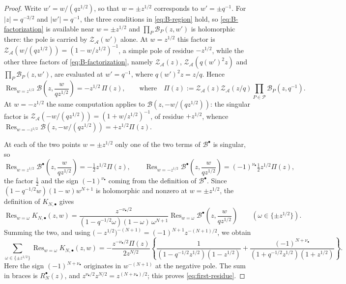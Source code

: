 \documentclass[a4paper,reqno]{amsart}
\numberwithin{equation}{section}
\theoremstyle{remark}
\theoremstyle{definition}
\newcommand{\A}{\mathcal{A}}
\begin{document}
\begin{proof}
Write $w'=w/(qz^{1/2})$, so that $w=\pm z^{1/2}$ corresponds to
$w'=\pm q^{-1}$. For $|z|=q^{-3/2}$ and $|w'|=q^{-1}$, the three conditions
in \eqref{eq:B-region} hold, so \eqref{eq:B-factorization} is available near
$w=\pm z^{1/2}$ and $\prod_P\mathcal B_P(z,w')$ is holomorphic there: the
pole is carried by $\mathcal Z_{\A}(w')$ alone. At $w=z^{1/2}$ this factor
is $\mathcal Z_{\A}(w/(qz^{1/2}))=(1-w/z^{1/2})^{-1}$, a simple pole of
residue $-z^{1/2}$, while the other three factors of
\eqref{eq:B-factorization}, namely $\mathcal Z_{\A}(z)$,
$\mathcal Z_{\A}(q(w')^2z)$ and $\prod_P\mathcal B_P(z,w')$, are evaluated
at $w'=q^{-1}$, where $q(w')^2z=z/q$. Hence
$$
\operatorname{Res}_{w=z^{1/2}}\mathcal B\!\left(z,\frac{w}{qz^{1/2}}\right)
=-z^{1/2}\,\Pi(z),
\qquad\text{where}\quad
\Pi(z):=\mathcal Z_{\A}(z)\mathcal Z_{\A}(z/q)
\prod_{P\in\mathcal P}\mathcal B_P(z,q^{-1}).
$$
At $w=-z^{1/2}$ the same computation applies to
$\mathcal B(z,-w/(qz^{1/2}))$: the singular factor is
$\mathcal Z_{\A}(-w/(qz^{1/2}))=(1+w/z^{1/2})^{-1}$, of residue
$+z^{1/2}$, whence
$\operatorname{Res}_{w=-z^{1/2}}\mathcal B(z,-w/(qz^{1/2}))=+z^{1/2}\Pi(z)$.

At each of the two points $w=\pm z^{1/2}$ only one of the two terms of
$\mathcal B^{\bullet}$ is singular, so
$$
\operatorname{Res}_{w=z^{1/2}}
\mathcal B^{\bullet}\!\left(z,\frac{w}{qz^{1/2}}\right)
=-\tfrac12z^{1/2}\Pi(z),
\qquad
\operatorname{Res}_{w=-z^{1/2}}
\mathcal B^{\bullet}\!\left(z,\frac{w}{qz^{1/2}}\right)
=(-1)^{\nu_\bullet}\tfrac12z^{1/2}\Pi(z),
$$
the factor $\tfrac12$ and the sign $(-1)^{\nu_\bullet}$ coming from the
definition of $\mathcal B^{\bullet}$. Since $(1-q^{-1/2}w)(1-w)w^{N+1}$ is
holomorphic and nonzero at $w=\pm z^{1/2}$, the definition of
$K_{N,\bullet}$ gives
$$
\operatorname{Res}_{w=\omega}K_{N,\bullet}(z,w)
=
\frac{z^{-\nu_\bullet/2}}
{(1-q^{-1/2}\omega)(1-\omega)\,\omega^{N+1}}
\operatorname{Res}_{w=\omega}
\mathcal B^{\bullet}\!\left(z,\frac{w}{qz^{1/2}}\right)
\qquad(\omega\in\{\pm z^{1/2}\}).
$$
Summing the two, and using
$\bigl(-z^{1/2}\bigr)^{-(N+1)}=(-1)^{N+1}z^{-(N+1)/2}$, we obtain
$$
\sum_{\omega\in\{\pm z^{1/2}\}}\operatorname{Res}_{w=\omega}K_{N,\bullet}(z,w)
=-\frac{z^{-\nu_\bullet/2}\Pi(z)}{2z^{N/2}}
\left\{\frac{1}{(1-q^{-1/2}z^{1/2})(1-z^{1/2})}
+\frac{(-1)^{N+\nu_\bullet}}{(1+q^{-1/2}z^{1/2})(1+z^{1/2})}\right\}.
$$
Here the sign $(-1)^{N+\nu_\bullet}$ originates in $w^{-(N+1)}$ at the
negative pole. The sum in braces is $R_N^{\bullet}(z)$, and
$z^{\nu_\bullet/2}z^{N/2}=z^{(N+\nu_\bullet)/2}$; this proves
\eqref{eq:first-residue}.
\end{proof}
\end{document}
